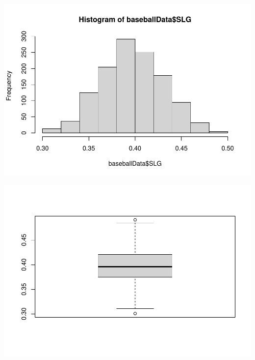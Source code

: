 \documentclass[
]{article}
\newenvironment{Shaded}{\begin{snugshade}}{\end{snugshade}}
\newcommand{\KeywordTok}[1]{\textcolor[rgb]{0.13,0.29,0.53}{\textbf{#1}}}
\newcommand{\NormalTok}[1]{#1}
\newcommand{\OperatorTok}[1]{\textcolor[rgb]{0.81,0.36,0.00}{\textbf{#1}}}
\begin{document}
\includegraphics{HW2_Liu-Zi-Jian_files/figure-latex/unnamed-chunk-31-1.pdf}

\begin{Shaded}
\end{Shaded}

\includegraphics{HW2_Liu-Zi-Jian_files/figure-latex/unnamed-chunk-31-2.pdf}

\begin{Shaded}
\end{Shaded}
\end{document}
